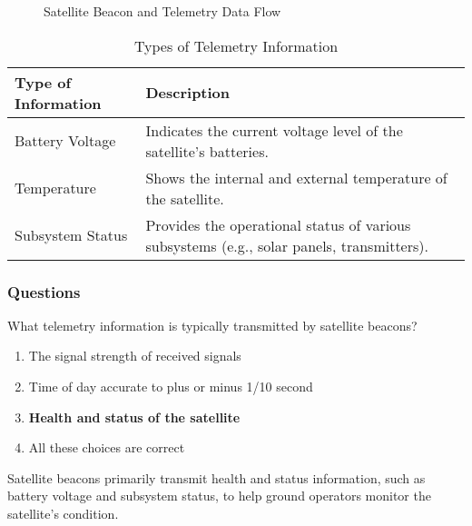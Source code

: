 \begin{figure}[h]
    \centering
    \caption{Satellite Beacon and Telemetry Data Flow}
    \label{fig:sat-beacon-telemetry}
\end{figure}

\begin{table}[h]
    \centering
    \begin{tabular}{|l|l|}
        \hline
        \textbf{Type of Information} & \textbf{Description} \\
        \hline
        Battery Voltage & Indicates the current voltage level of the satellite's batteries. \\
        Temperature & Shows the internal and external temperature of the satellite. \\
        Subsystem Status & Provides the operational status of various subsystems (e.g., solar panels, transmitters). \\
        \hline
    \end{tabular}
    \caption{Types of Telemetry Information}
    \label{tab:telemetry-types}
\end{table}

\subsubsection{Questions}

\begin{tcolorbox}[colback=gray!10!white,colframe=black!75!black,title={T8B01}]
    What telemetry information is typically transmitted by satellite beacons?
    \begin{enumerate}[label=\Alph*),noitemsep]
        \item The signal strength of received signals
        \item Time of day accurate to plus or minus 1/10 second
        \item \textbf{Health and status of the satellite}
        \item All these choices are correct
    \end{enumerate}
\end{tcolorbox}
 Satellite beacons primarily transmit health and status information, such as battery voltage and subsystem status, to help ground operators monitor the satellite's condition.

